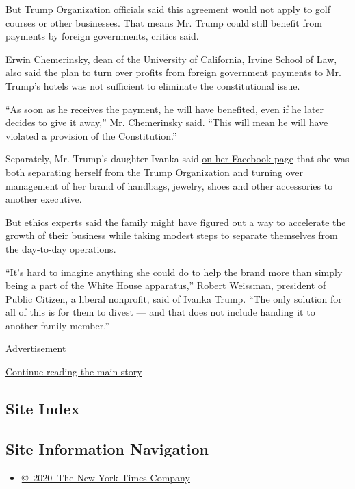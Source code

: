 But Trump Organization officials said this agreement would not apply to
golf courses or other businesses. That means Mr. Trump could still
benefit from payments by foreign governments, critics said.

Erwin Chemerinsky, dean of the University of California, Irvine School
of Law, also said the plan to turn over profits from foreign government
payments to Mr. Trump's hotels was not sufficient to eliminate the
constitutional issue.

``As soon as he receives the payment, he will have benefited, even if he
later decides to give it away,'' Mr. Chemerinsky said. ``This will mean
he will have violated a provision of the Constitution.''

Separately, Mr. Trump's daughter Ivanka said
\href{https://www.facebook.com/IvankaTrump/posts/10154998180397682}{on
her Facebook page} that she was both separating herself from the Trump
Organization and turning over management of her brand of handbags,
jewelry, shoes and other accessories to another executive.

But ethics experts said the family might have figured out a way to
accelerate the growth of their business while taking modest steps to
separate themselves from the day-to-day operations.

``It's hard to imagine anything she could do to help the brand more than
simply being a part of the White House apparatus,'' Robert Weissman,
president of Public Citizen, a liberal nonprofit, said of Ivanka Trump.
``The only solution for all of this is for them to divest --- and that
does not include handing it to another family member.''

Advertisement

\protect\hyperlink{after-bottom}{Continue reading the main story}

\hypertarget{site-index}{%
\subsection{Site Index}\label{site-index}}

\hypertarget{site-information-navigation}{%
\subsection{Site Information
Navigation}\label{site-information-navigation}}

\begin{itemize}
\tightlist
\item
  \href{https://help.nytimes.com/hc/en-us/articles/115014792127-Copyright-notice}{©~2020~The
  New York Times Company}
\end{itemize}

